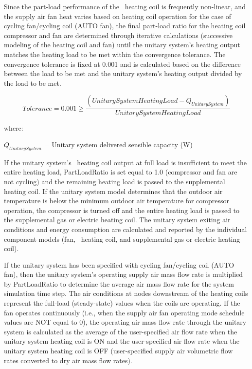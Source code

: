 Since the part-load performance of the~ heating coil is frequently non-linear, and the supply air fan heat varies based on heating coil operation for the case of cycling fan/cycling coil (AUTO fan), the final part-load ratio for the heating coil compressor and fan are determined through iterative calculations (successive modeling of the heating coil and fan) until the unitary system's heating output matches the heating load to be met within the convergence tolerance. The convergence tolerance is fixed at 0.001 and is calculated based on the difference between the load to be met and the unitary system's heating output divided by the load to be met.

\begin{equation}
Tolerance = 0.001 \ge \frac{{\left( {UnitarySystemHeatingLoad - {Q_{UnitarySystem}}} \right)}}{{UnitarySystemHeatingLoad}}
\end{equation}

where:

\({Q_{UnitarySystem}}\) = Unitary system delivered sensible capacity (W)

If the unitary system's~ heating coil output at full load is insufficient to meet the entire heating load, PartLoadRatio is set equal to 1.0 (compressor and fan are not cycling) and the remaining heating load is passed to the supplemental heating coil. If the unitary system model determines that the outdoor air temperature is below the minimum outdoor air temperature for compressor operation, the compressor is turned off and the entire heating load is passed to the supplemental gas or electric heating coil. The unitary system exiting air conditions and energy consumption are calculated and reported by the individual component models (fan,~ heating coil, and supplemental gas or electric heating coil).

If the unitary system has been specified with cycling fan/cycling coil (AUTO fan), then the unitary system's operating supply air mass flow rate is multiplied by PartLoadRatio to determine the average air mass flow rate for the system simulation time step. The air conditions at nodes downstream of the heating coils represent the full-load (steady-state) values when the coils are operating. If the fan operates continuously (i.e., when the supply air fan operating mode schedule values are NOT equal to 0), the operating air mass flow rate through the unitary system is calculated as the average of the user-specified air flow rate when the unitary system heating coil is ON and the user-specified air flow rate when the unitary system heating coil is OFF (user-specified supply air volumetric flow rates converted to dry air mass flow rates).

